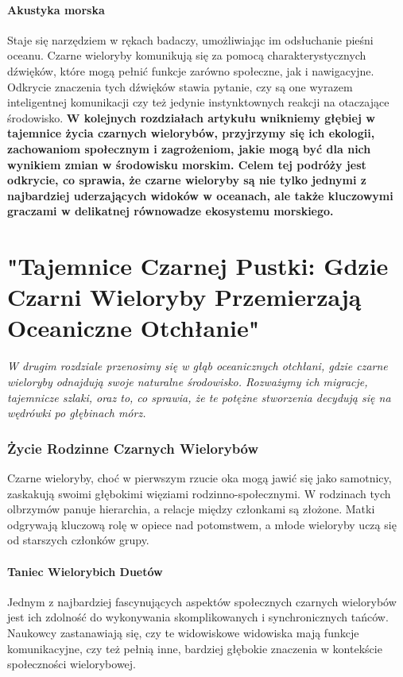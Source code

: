 \documentclass{article}
\begin{document}
\subsection{Akustyka morska}
Staje się narzędziem w rękach badaczy, umożliwiając im odsłuchanie pieśni oceanu. Czarne wieloryby komunikują się za pomocą charakterystycznych dźwięków, które mogą pełnić funkcje zarówno społeczne, jak i nawigacyjne. Odkrycie znaczenia tych dźwięków stawia pytanie, czy są one wyrazem inteligentnej komunikacji czy też jedynie instynktownych reakcji na otaczające środowisko.
\newline
\newline
\newline
\textbf{W kolejnych rozdziałach artykułu wnikniemy głębiej w tajemnice życia czarnych wielorybów, przyjrzymy się ich ekologii, zachowaniom społecznym i zagrożeniom, jakie mogą być dla nich wynikiem zmian w środowisku morskim. Celem tej podróży jest odkrycie, co sprawia, że czarne wieloryby są nie tylko jednymi z najbardziej uderzających widoków w oceanach, ale także kluczowymi graczami w delikatnej równowadze ekosystemu morskiego.}
\newpage
\part{"Tajemnice Czarnej Pustki: Gdzie Czarni Wieloryby Przemierzają Oceaniczne Otchłanie"}
\textsl{W drugim rozdziale przenosimy się w głąb oceanicznych otchłani, gdzie czarne wieloryby odnajdują swoje naturalne środowisko. Rozważymy ich migracje, tajemnicze szlaki, oraz to, co sprawia, że te potężne stworzenia decydują się na wędrówki po głębinach mórz.}
\section{Życie Rodzinne Czarnych Wielorybów}
Czarne wieloryby, choć w pierwszym rzucie oka mogą jawić się jako samotnicy, zaskakują swoimi głębokimi więziami rodzinno-społecznymi. W rodzinach tych olbrzymów panuje hierarchia, a relacje między członkami są złożone. Matki odgrywają kluczową rolę w opiece nad potomstwem, a młode wieloryby uczą się od starszych członków grupy.
\subsection{Taniec Wielorybich Duetów}
Jednym z najbardziej fascynujących aspektów społecznych czarnych wielorybów jest ich zdolność do wykonywania skomplikowanych i synchronicznych tańców. Naukowcy zastanawiają się, czy te widowiskowe widowiska mają funkcje komunikacyjne, czy też pełnią inne, bardziej głębokie znaczenia w kontekście społeczności wielorybowej.
\newpage
\end{document}
